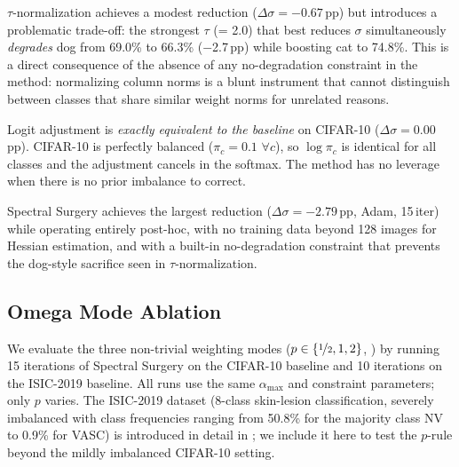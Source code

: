 \documentclass[11pt,a4paper]{article}
\begin{document}
$\tau$-normalization achieves a modest reduction
($\Delta\sigma = -0.67$\,pp) but introduces a problematic trade-off:
the strongest $\tau$ (= 2.0) that best reduces $\sigma$ simultaneously
\emph{degrades} dog from 69.0\% to 66.3\% ($-$2.7\,pp) while
boosting cat to 74.8\%. This is a direct consequence of the absence
of any no-degradation constraint in the method: normalizing column norms
is a blunt instrument that cannot distinguish between classes that share
similar weight norms for unrelated reasons.

Logit adjustment is \emph{exactly equivalent to the baseline} on
CIFAR-10 ($\Delta\sigma = 0.00$\,pp). CIFAR-10 is perfectly balanced
($\pi_c = 0.1$ $\forall c$), so $\log\pi_c$ is identical for all
classes and the adjustment cancels in the softmax. The method has no
leverage when there is no prior imbalance to correct.

Spectral Surgery achieves the largest reduction
($\Delta\sigma = -2.79$\,pp, Adam, 15\,iter) while operating entirely
post-hoc, with no training data beyond 128 images for Hessian
estimation, and with a built-in no-degradation constraint that prevents
the dog-style sacrifice seen in $\tau$-normalization.

\subsection{Omega Mode Ablation}
\label{sec:omega-ablation}

We evaluate the three non-trivial weighting modes ($p \in \{\nicefrac{1}{2}, 1, 2\}$,
) by running 15 iterations of Spectral Surgery on the
CIFAR-10 baseline and 10 iterations on the ISIC-2019 baseline. All runs
use the same $\alpha_{\max}$ and constraint parameters; only $p$ varies.
The ISIC-2019 dataset (8-class skin-lesion classification, severely
imbalanced with class frequencies ranging from 50.8\% for the majority
class NV to 0.9\% for VASC) is introduced in detail in
; we include it here to test the $p$-rule beyond
the mildly imbalanced CIFAR-10 setting.
\end{document}
